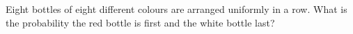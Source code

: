 Eight bottles of eight different colours are arranged uniformly in a row. What is the probability the red bottle is first and the white bottle last?
